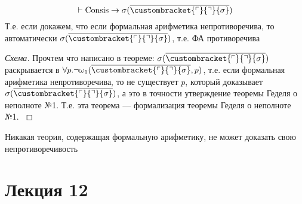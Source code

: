 \documentclass[oneside]{book}
\newcommand{\gedel}[1]{\custombracket{\ulcorner}{\urcorner}{#1}}
\newcommand{\gedel}[1]{\custombracket{\ulcorner}{\urcorner}{#1}}
\newcommand{\gedel}[1]{\custombracket{\ulcorner}{\urcorner}{#1}}
\newcommand{\gedel}[1]{\custombracket{\ulcorner}{\urcorner}{#1}}
\renewcommand{\leftmark}{}
\begin{document}
\begin{theorem}
	\[ \vdash {\rm Consis} \to \sigma(\overline{\gedel{\sigma}}) \]
	Т.е. если докажем, что если формальная арифметика непротиворечива, то автоматически \(\sigma(\overline{\gedel{\sigma}})\), т.е. ФА противоречива
	\label{org85a9309}
\end{theorem}
\begin{proof}[Схема]
	Прочтем что написано в теореме: \(\sigma(\overline{\gedel{\sigma}})\) раскрывается в \(\forall p. \neg \omega_1(\overline{\gedel{\sigma}}, p)\), т.е. если формальная арифметика непротиворечива, то не существует \(p\), который доказывает \(\sigma(\overline{\gedel{\sigma}})\), а это в точности утверждение теоремы Геделя о неполноте №1. Т.е. эта теорема --- формализация теоремы Геделя о неполноте №1.
	\label{org5fe83e6}
\end{proof}
\begin{corollary}
	Никакая теория, содержащая формальную арифметику, не может доказать свою непротиворечивость
	\label{org291d426}
\end{corollary}
\chapter*{Лекция 12}\renewcommand{\leftmark}{Лекция 12}
\label{sec:org48965f6}
\end{document}
